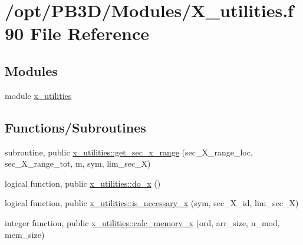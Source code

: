 \hypertarget{X__utilities_8f90}{}\section{/opt/\+P\+B3\+D/\+Modules/\+X\+\_\+utilities.f90 File Reference}
\label{X__utilities_8f90}
\subsection*{Modules}
\begin{DoxyCompactItemize}
\item 
module \hyperlink{namespacex__utilities}{x\+\_\+utilities}
\end{DoxyCompactItemize}
\subsection*{Functions/\+Subroutines}
\begin{DoxyCompactItemize}
\item 
subroutine, public \hyperlink{namespacex__utilities_a6072ddd1fd230758795ff320c75a1f6a}{x\+\_\+utilities\+::get\+\_\+sec\+\_\+x\+\_\+range} (sec\+\_\+\+X\+\_\+range\+\_\+loc, sec\+\_\+\+X\+\_\+range\+\_\+tot, m, sym, lim\+\_\+sec\+\_\+X)
\item 
logical function, public \hyperlink{namespacex__utilities_adef8eab82f0fd670a7795c754cf9a8f9}{x\+\_\+utilities\+::do\+\_\+x} ()
\item 
logical function, public \hyperlink{namespacex__utilities_a689aca7fedb49c43c5a65a18d557259f}{x\+\_\+utilities\+::is\+\_\+necessary\+\_\+x} (sym, sec\+\_\+\+X\+\_\+id, lim\+\_\+sec\+\_\+X)
\item 
integer function, public \hyperlink{namespacex__utilities_a4d18921da77463d069346f1c7322b451}{x\+\_\+utilities\+::calc\+\_\+memory\+\_\+x} (ord, arr\+\_\+size, n\+\_\+mod, mem\+\_\+size)
\end{DoxyCompactItemize}

